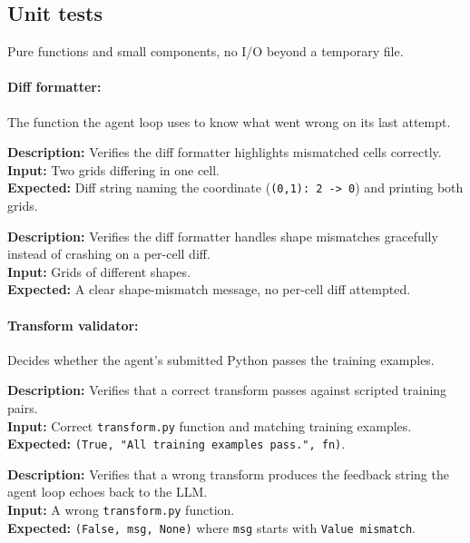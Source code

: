 \documentclass[11pt,a4paper]{article}
\begin{document}
\subsection{Unit tests}

Pure functions and small components, no I/O beyond a temporary file.

\paragraph{Diff formatter:}
The function the agent loop uses to know what went wrong on its last attempt.
\begin{description}[leftmargin=10pt,style=nextline,itemsep=6pt,parsep=1pt,font=\normalfont]
  \item[\texttt{test\_format\_diff}]
    \textbf{Description:} Verifies the diff formatter highlights mismatched cells correctly. \\
    \textbf{Input:} Two grids differing in one cell. \\
    \textbf{Expected:} Diff string naming the coordinate (\texttt{(0,1): 2 -> 0}) and printing both grids.
  \item[\texttt{test\_format\_diff\_shape\_mismatch}]
    \textbf{Description:} Verifies the diff formatter handles shape mismatches gracefully instead of crashing on a per-cell diff. \\
    \textbf{Input:} Grids of different shapes. \\
    \textbf{Expected:} A clear shape-mismatch message, no per-cell diff attempted.
\end{description}

\paragraph{Transform validator:}
Decides whether the agent's submitted Python passes the training examples.
\begin{description}[leftmargin=10pt,style=nextline,itemsep=6pt,parsep=1pt,font=\normalfont]
  \item[\texttt{test\_run\_transform\_success}]
    \textbf{Description:} Verifies that a correct transform passes against scripted training pairs. \\
    \textbf{Input:} Correct \texttt{transform.py} function and matching training examples. \\
    \textbf{Expected:} \texttt{(True, "All training examples pass.", fn)}.
  \item[\texttt{test\_test\_transform\_failure}]
    \textbf{Description:} Verifies that a wrong transform produces the feedback string the agent loop echoes back to the LLM. \\
    \textbf{Input:} A wrong \texttt{transform.py} function. \\
    \textbf{Expected:} \texttt{(False, msg, None)} where \texttt{msg} starts with \texttt{Value mismatch}.
\end{description}
\end{document}
